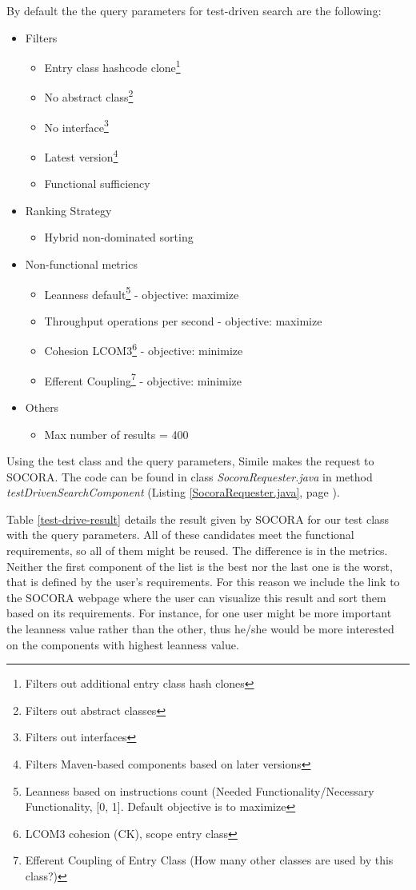 {By default the the query parameters for test-driven search are the following:

\begin{itemize}
\item Filters
	\begin{itemize}
	\item Entry class hashcode clone\footnote{Filters out additional entry class hash clones}
	\item No abstract class\footnote{Filters out abstract classes}
	\item No interface\footnote{Filters out interfaces}
	\item Latest version\footnote{Filters Maven-based components based on later versions}
	\item Functional sufficiency
	\end{itemize}
\item Ranking Strategy
	\begin{itemize}
	\item Hybrid non-dominated sorting
	\end{itemize}
\item Non-functional metrics
	\begin{itemize}
	\item Leanness default\footnote{Leanness based on instructions count (Needed Functionality/Necessary Functionality, [0, 1]. Default objective is to maximize} - objective: maximize
	\item Throughput operations per second - objective: maximize
	\item Cohesion LCOM3\footnote{LCOM3 cohesion (CK), scope entry class} - objective: minimize
	\item Efferent Coupling\footnote{Efferent Coupling of Entry Class (How many other classes are used by this class?)} - objective: minimize
	\end{itemize}
\item Others
	\begin{itemize}
	\item Max number of results = 400
	\end{itemize}
\end{itemize}

Using the test class and the query parameters, Simile makes the request to SOCORA. The code can be found in class \emph{SocoraRequester.java} in method \emph{testDrivenSearchComponent} (Listing \ref{SocoraRequester.java}, page \pageref{SocoraRequester.java}).

Table \ref{test-drive-result} details the result given by SOCORA for our test class with the query parameters. All of these candidates meet the functional requirements, so all of them might be reused. The difference is in the metrics. Neither the first component of the list is the best nor the last one is the worst, that is defined by the user's requirements. For this reason we include the link to the SOCORA webpage where the user can visualize this result and sort them based on its requirements. For instance, for one user might be more important the leanness value rather than the other, thus he/she would be more interested on the components with highest leanness value.

}
